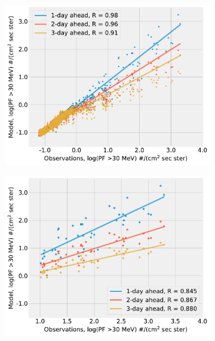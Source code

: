 \begin{figure}[htp]
\begin{subfigure}{0.4\textwidth}
         \centering
         \includegraphics[width=\textwidth]{chapter4/figs/scatterplot_obs_vs_model_valset_3in1_log_PF30.pdf}
    \end{subfigure}
    \begin{subfigure}{0.4\textwidth}
         \centering
         \includegraphics[width=\textwidth]{chapter4/figs/scatterplot_obs_vs_model_valset_3in1_LOG_PF_LT1_log_PF30.pdf}
    \end{subfigure}
    \begin{subfigure}{0.4\textwidth}
         \centering

\end{subfigure}
\end{figure}

